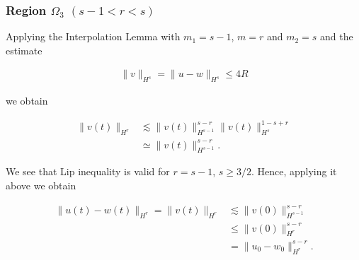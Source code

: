\documentclass{beamer}
\numberwithin{equation}{section}
\begin{document}
\begin{frame}
\frametitle{Region $\Omega_{3}$ $(s-1 < r < s)$} 


Applying the Interpolation Lemma with $m_{1} = s-1$, $m =r$ and $m_{2} = s$ and
the estimate


\begin{equation*}
\begin{split}
  \|v\|_{H^{s}} = \|u - w \|_{H^{s}} \le 4R
\end{split}
\end{equation*}


we obtain


\begin{equation*}
  \label{pre-lip-ap}
\begin{split}
  \| v(t) \|_{H^{r}} & \lesssim \| v(t) \|_{H^{s-1}}^{s-r} \|v(t) \|_{H^{s}}^{1-s+r}
  \\
  & \simeq \| v(t) \|_{H^{s-1}}^{s-r}.
\end{split}
\end{equation*}


\end{frame}
\begin{frame}
We see that Lip inequality is valid for  $r = s-1$, $s \ge 3/2$. Hence,
applying it above we obtain 


\begin{equation*}
\begin{split}
    \|u(t) - w(t) \|_{H^{r}} = \| v(t) \|_{H^{r}} & \lesssim \|v(0) \|_{H^{s-1}}^{s-r}
   \\
   & \le \|v(0) \|_{H^{r}}^{s-r} 
  \\
  & = \|u_{0} - w_{0}\|_{H^{r}}^{s-r}.
\end{split}
\end{equation*}

\end{frame}













\end{document}
